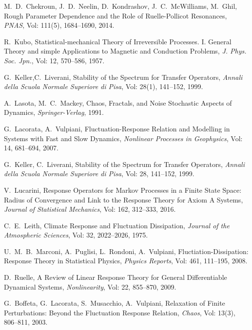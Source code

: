 \begin{thebibliography}{9999}


M.~D.~Chekroun, J.~D.~Neelin, D.~Kondrashov, J.~C.~McWilliams, M.~Ghil, Rough Parameter Dependence and the Role of Ruelle-Pollicot Resonances, \emph{PNAS}, Vol: 111(5), 1684--1690, 2014.

R.~Kubo, Statistical-mechanical Theory of Irreversible Processes. I. General Theory and simple Applications to Magnetic and Conduction Problems, \emph{J. Phys. Soc. Jpn.}, Vol: 12, 570--586, 1957.

G.~Keller,C.~Liverani, Stability of the Spectrum for Transfer Operators, \emph{Annali della Scuola Normale Superiore di Pisa}, Vol: 28(1), 141--152, 1999.

A.~Lasota, M.~C.~Mackey, Chaos, Fractals, and Noise Stochastic Aspects of Dynamics, \emph{Springer-Verlag}, 1991.

G.~Lacorata, A.~Vulpiani, Fluctuation-Response Relation and Modelling in Systems with Fast and Slow Dynamics, \emph{Nonlinear Processes in Geophysics}, Vol: 14, 681--694, 2007.

G.~Keller, C.~Liverani, Stability of the Spectrum for Transfer Operators, \emph{Annali della Scuola Normale Superiore di Pisa}, Vol: 28, 141--152, 1999.

V.~Lucarini, Response Operators for Markov Processes in a Finite State Space: Radius of Convergence and Link to the Response Theory for Axiom A Systems, \emph{Journal of Statistical Mechanics}, Vol: 162, 312--333, 2016.

C.~E.~Leith, Climate Response and Fluctuation Dissipation, \emph{Journal of the Atmospheric Sciences}, Vol: 32, 2022--2026, 1975.

U.~M.~B.~Marconi, A.~Puglisi, L.~Rondoni, A.~Vulpiani, Fluctiation-Dissipation: Response Theory in Statistical Physics, \emph{Physics Reports}, Vol: 461, 111--195, 2008.

D.~Ruelle, A Review of Linear Response Theory for General Differentiable Dynamical Systems, \emph{Nonlinearity}, Vol: 22, 855--870, 2009.

G.~Boffeta, G.~Lacorata, S.~Musacchio, A.~Vulpiani, Relaxation of Finite Perturbations: Beyond the Fluctuation Response Relation, \emph{Chaos}, Vol: 13(3), 806--811, 2003.

\end{thebibliography} 